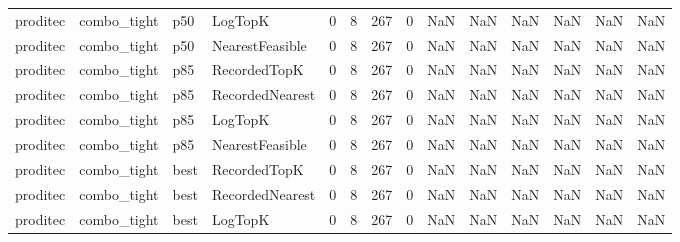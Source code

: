 \begin{tabular}{llllrrrrrrrrrr}
proditec &          combo\_tight &    p50 &         LogTopK &           0 &          8 &            267 &                   0 &            NaN &             NaN &                       NaN &            NaN &                    NaN &                     NaN \\
proditec &          combo\_tight &    p50 & NearestFeasible &           0 &          8 &            267 &                   0 &            NaN &             NaN &                       NaN &            NaN &                    NaN &                     NaN \\
proditec &          combo\_tight &    p85 &    RecordedTopK &           0 &          8 &            267 &                   0 &            NaN &             NaN &                       NaN &            NaN &                    NaN &                     NaN \\
proditec &          combo\_tight &    p85 & RecordedNearest &           0 &          8 &            267 &                   0 &            NaN &             NaN &                       NaN &            NaN &                    NaN &                     NaN \\
proditec &          combo\_tight &    p85 &         LogTopK &           0 &          8 &            267 &                   0 &            NaN &             NaN &                       NaN &            NaN &                    NaN &                     NaN \\
proditec &          combo\_tight &    p85 & NearestFeasible &           0 &          8 &            267 &                   0 &            NaN &             NaN &                       NaN &            NaN &                    NaN &                     NaN \\
proditec &          combo\_tight &   best &    RecordedTopK &           0 &          8 &            267 &                   0 &            NaN &             NaN &                       NaN &            NaN &                    NaN &                     NaN \\
proditec &          combo\_tight &   best & RecordedNearest &           0 &          8 &            267 &                   0 &            NaN &             NaN &                       NaN &            NaN &                    NaN &                     NaN \\
proditec &          combo\_tight &   best &         LogTopK &           0 &          8 &            267 &                   0 &            NaN &             NaN &                       NaN &            NaN &                    NaN &                     NaN \\

\end{tabular}
